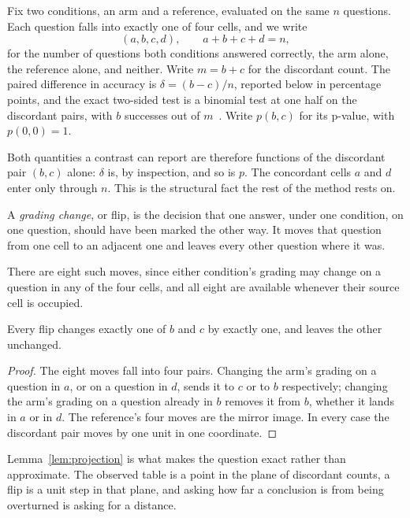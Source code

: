 Fix two conditions, an arm and a reference, evaluated on the same $n$ questions.
Each question falls into exactly one of four cells, and we write
\begin{equation}
  (a, b, c, d), \qquad a + b + c + d = n,
\end{equation}
for the number of questions both conditions answered correctly, the arm alone,
the reference alone, and neither. Write $m = b + c$ for the discordant count.
The paired difference in accuracy is $\delta = (b - c)/n$, reported below in
percentage points, and the exact two-sided test is a binomial test at one half
on the discordant pairs, with $b$ successes out of $m$~\cite{mcnemar1947note}.
Write $p(b, c)$ for its p-value, with $p(0,0) = 1$.

Both quantities a contrast can report are therefore functions of the discordant
pair $(b, c)$ alone: $\delta$ is, by inspection, and so is $p$. The concordant
cells $a$ and $d$ enter only through $n$. This is the structural fact the rest
of the method rests on.

\begin{definition}\label{def:flip}
A \emph{grading change}, or flip, is the decision that one answer, under one
condition, on one question, should have been marked the other way. It moves that
question from one cell to an adjacent one and leaves every other question where
it was.
\end{definition}

There are eight such moves, since either condition's grading may change on a
question in any of the four cells, and all eight are available whenever their
source cell is occupied.

\begin{lemma}\label{lem:projection}
Every flip changes exactly one of $b$ and $c$ by exactly one, and leaves the
other unchanged.
\end{lemma}

\begin{proof}
The eight moves fall into four pairs. Changing the arm's grading on a question
in $a$, or on a question in $d$, sends it to $c$ or to $b$ respectively;
changing the arm's grading on a question already in $b$ removes it from $b$,
whether it lands in $a$ or in $d$. The reference's four moves are the mirror
image. In every case the discordant pair moves by one unit in one coordinate.
\end{proof}

Lemma~\ref{lem:projection} is what makes the question exact rather than
approximate. The observed table is a point in the plane of discordant counts, a
flip is a unit step in that plane, and asking how far a conclusion is from being
overturned is asking for a distance.


